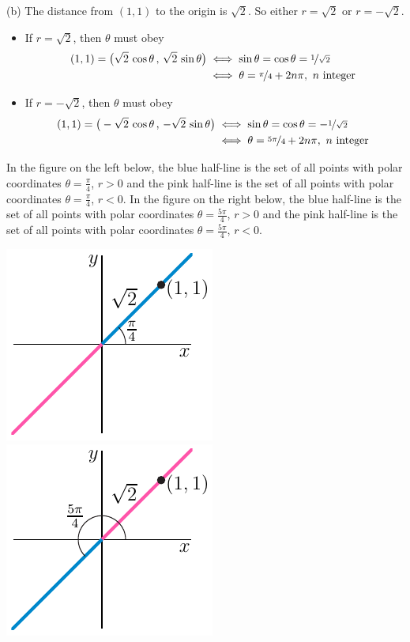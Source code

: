 \begin{solution}
(b)
The distance from $(1,1)$ to the origin is $\sqrt{2}$. 
So either $r=\sqrt{2}$ or $r=-\sqrt{2}$.
\begin{itemize}
\item If $r=\sqrt{2}$, then $\theta$ must obey 
\begin{align*}
(1,1) = \big(\sqrt{2}\,\cos\theta\,,\,\sqrt{2}\,\sin\theta\big)
&\iff \sin\theta=\cos\theta=\nicefrac{1}{\sqrt{2}} \\
&\iff \theta= \nicefrac{\pi}{4} + 2n\pi,\ n\text{ integer }
\end{align*}
\item If $r=-\sqrt{2}$, then $\theta$ must obey 
\begin{align*}
(1,1) = \big(-\sqrt{2}\,\cos\theta\,,\,-\sqrt{2}\,\sin\theta\big)
&\iff \sin\theta=\cos\theta=-\nicefrac{1}{\sqrt{2}} \\
&\iff \theta= \nicefrac{5\pi}{4} + 2n\pi,\ n\text{ integer }
\end{align*}
\end{itemize}
In the figure on the left below, the blue half-line is the set of all points 
with polar coordinates $\theta=\frac{\pi}{4}$, $r>0$ and the pink half-line 
is the set of all points  with polar coordinates $\theta=\frac{\pi}{4}$, $r<0$. 
In the figure on the right below, the blue half-line is the set of all points 
with polar coordinates $\theta=\frac{5\pi}{4}$, $r>0$ and the pink 
half-line is the set of all points  with polar coordinates 
$\theta=\frac{5\pi}{4}$, $r<0$. 
\begin{center}
  \includegraphics{fig/polar4A.pdf}\qquad
  \includegraphics{fig/polar4B.pdf}
\end{center}


\end{solution}
